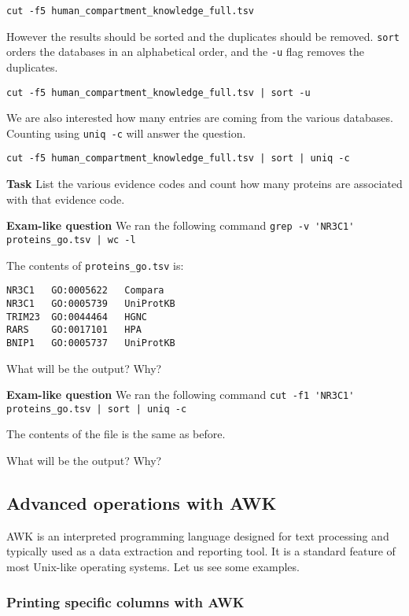 \documentclass{article}\usepackage[]{graphicx}\usepackage[usenames,dvipsnames]{color}
\begin{document}
\begin{verbatim}
cut -f5 human_compartment_knowledge_full.tsv
\end{verbatim}

However the results should be sorted and the duplicates should be removed. \verb+sort+ orders the databases in an alphabetical order, and the \verb+-u+ flag removes the duplicates.

\begin{verbatim}
cut -f5 human_compartment_knowledge_full.tsv | sort -u
\end{verbatim}

We are also interested how many entries are coming from the various databases. Counting using \verb+uniq -c+ will answer the question.

\begin{verbatim}
cut -f5 human_compartment_knowledge_full.tsv | sort | uniq -c
\end{verbatim}

\textbf{Task} List the various evidence codes and count how many proteins are associated with that evidence code.

\textbf{Exam-like question} We ran the following command \verb+grep -v 'NR3C1' proteins_go.tsv | wc -l+

The contents of \verb+proteins_go.tsv+ is:
\begin{verbatim}
NR3C1   GO:0005622   Compara
NR3C1   GO:0005739   UniProtKB
TRIM23  GO:0044464   HGNC
RARS    GO:0017101   HPA
BNIP1   GO:0005737   UniProtKB
\end{verbatim}

What will be the output? Why?

\textbf{Exam-like question} We ran the following command \verb+cut -f1 'NR3C1' proteins_go.tsv | sort | uniq -c+

The contents of the file is the same as before.

What will be the output? Why?

\subsection{Advanced operations with AWK}

AWK is an interpreted programming language designed for text processing and typically used as a data extraction and reporting tool. It is a standard feature of most Unix-like operating systems. Let us see some examples.

\subsubsection*{Printing specific columns with AWK}
\end{document}
